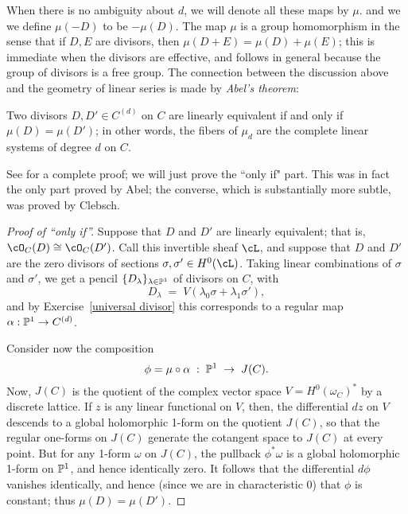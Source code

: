 %

When there is no ambiguity about $d$, we will denote all these maps  by $\mu$.  and we 
we define $\mu(-D)$ to be $-\mu(D)$. 
The map $\mu$ is a group homomorphism in the sense that if $D, E$ are divisors, then
$\mu (D+E) = \mu(D) + \mu(E)$; this is immediate when the divisors are effective, and 
follows in general because the group of divisors is a free group.
The connection between the discussion above and the geometry of linear series is made by \emph{Abel's theorem}:

\begin{theorem}
Two divisors $D, D' \in C^{(d)}$ on $C$ are linearly equivalent if and only if $\mu(D) = \mu(D')$; in other words, the fibers of $\mu_d$ are the complete linear systems of degree $d$ on $C$.
\end{theorem}

See \cite[Section 2.2]{GH}  for a complete proof; we will just prove the ``only if" part. This was in fact the only part proved by Abel; the converse, which is substantially more subtle, was proved by Clebsch.

\begin{proof}[Proof of ``only if'']
Suppose that $D$ and $D'$ are linearly equivalent; that is, $\cO_C(D) \cong \cO_C(D')$. Call this invertible sheaf $\cL$, and suppose that $D$ and $D'$ are the zero divisors of sections $\sigma, \sigma' \in H^0(\cL)$.
Taking linear combinations of $\sigma$ and $\sigma'$, we get a pencil $\{D_\lambda\}_{\lambda \in \PP^1}$ of divisors on $C$, with
$$
D_\lambda \; = \; V(\lambda_0\sigma + \lambda_1\sigma'),
$$
and by Exercise~\ref{universal divisor} this corresponds to a regular map $\alpha : \PP^1 \to C^{(d)}$. 

Consider now the composition
$$
\phi = \mu \circ \alpha \; : \; \PP^1 \; \to \; J(C).
$$
Now, $J(C)$ is the quotient of the complex vector space $V = H^0(\omega_C)^*$ by a discrete lattice. If $z$ is any linear functional on $V$, then, the differential $dz$  on $V$ descends to a global holomorphic 1-form on the quotient $J(C)$, so that the regular one-forms on $J(C)$ generate the cotangent space to $J(C)$ at every point. But for any 1-form $\omega$ on $J(C)$, the pullback $\phi^*\omega$ is a global holomorphic 1-form on $\PP^1$, and hence identically zero. It follows that the differential $d\phi$ vanishes identically, and hence (since we are in characteristic 0) that $\phi$ is constant; thus $\mu(D) = \mu(D')$.
\end{proof}

